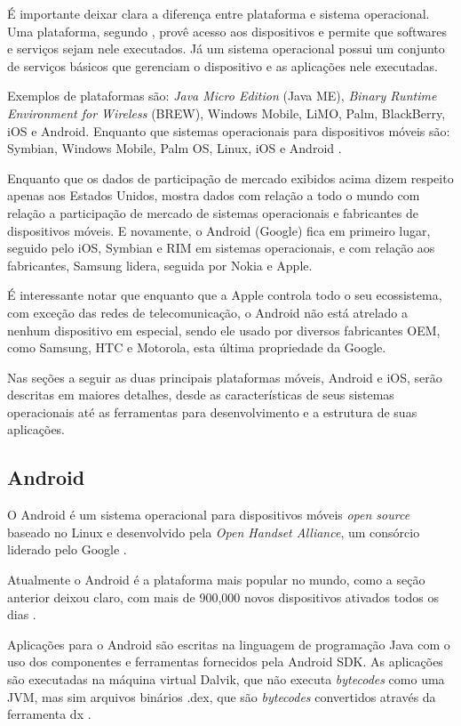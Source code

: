 \documentclass[diss]{template/setrem}
\begin{document}
É importante deixar clara a diferença entre plataforma e sistema operacional. Uma plataforma, segundo \citet{Fling2009}, provê acesso aos dispositivos e permite que softwares e serviços sejam nele executados. Já um sistema operacional possui um conjunto de serviços básicos que gerenciam o dispositivo e as aplicações nele executadas.

Exemplos de plataformas são: \emph{Java Micro Edition} (Java ME), \emph{Binary Runtime Environment for Wireless} (BREW), Windows Mobile, LiMO, Palm, BlackBerry, iOS e Android. Enquanto que sistemas operacionais para dispositivos móveis são: Symbian, Windows Mobile, Palm OS, Linux, iOS e Android \citep{Fling2009}.

Enquanto que os dados de participação de mercado exibidos acima dizem respeito apenas aos Estados Unidos, \citet{Gartner2012} mostra dados com relação a todo o mundo com relação a participação de mercado de sistemas operacionais e fabricantes de dispositivos móveis. E novamente, o Android (Google) fica em primeiro lugar, seguido pelo iOS, Symbian e RIM em sistemas operacionais, e com relação aos fabricantes, Samsung lidera, seguida por Nokia e Apple.

É interessante notar que enquanto que a Apple controla todo o seu ecossistema, com exceção das redes de telecomunicação, o Android não está atrelado a nenhum dispositivo em especial, sendo ele usado por diversos fabricantes OEM, como Samsung, HTC e Motorola, esta última propriedade da Google.

Nas seções a seguir as duas principais plataformas móveis, Android e iOS, serão descritas em maiores detalhes, desde as características de seus sistemas operacionais até as ferramentas para desenvolvimento e a estrutura de suas aplicações.

\subsection{Android}
O Android é um sistema operacional para dispositivos móveis \emph{open source} baseado no Linux e desenvolvido pela \emph{Open Handset Alliance}, um consórcio liderado pelo Google \citep{Braehler2010}.

Atualmente o Android é a plataforma mais popular no mundo, como a seção anterior deixou claro, com mais de 900,000 novos dispositivos ativados todos os dias \citep{Android2012}.

Aplicações para o Android são escritas na linguagem de programação Java com o uso dos componentes e ferramentas fornecidos pela Android SDK. As aplicações são executadas na máquina virtual Dalvik, que não executa \emph{bytecodes} como uma JVM, mas sim arquivos binários .dex, que são \emph{bytecodes} convertidos através da ferramenta dx \citep{Braehler2010}.
\end{document}
